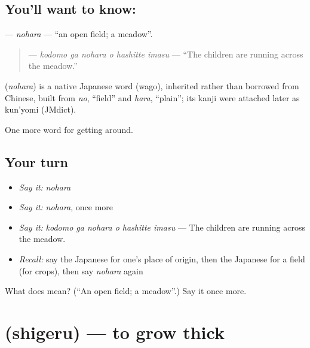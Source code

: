 \subsection*{You'll want to know: }
\textbf{} — \emph{nohara} — \textquotedblleft{}an open field; a meadow\textquotedblright{}.

\begin{quote}
\textbf{  } — \emph{kodomo ga nohara o hashitte imasu} — \textquotedblleft{}The children are running across the meadow.\textquotedblright{}
\end{quote}

\begin{cousinweb}
\textbf{} (\emph{nohara}) is a native Japanese word (wago), inherited rather than borrowed from Chinese, built from \emph{no}, \textquotedblleft{}field\textquotedblright{} and \emph{hara}, \textquotedblleft{}plain\textquotedblright{}; its kanji were attached later as kun'yomi (JMdict).
\end{cousinweb}

\begin{grammarlens}[title={What you've built}]
One more word for getting around.
\end{grammarlens}

\subsection*{Your turn}
\begin{itemize}
\raggedright
  \item \emph{Say it:} \emph{nohara}
  \item \emph{Say it:} \emph{nohara}, once more
  \item \emph{Say it:} \emph{kodomo ga nohara o hashitte imasu} — The children are running across the meadow.
  \item \emph{Recall:} say the Japanese for one's place of origin, then the Japanese for a field (for crops), then say \emph{nohara} again
\end{itemize}

\begin{tcolorbox}[breakable,colback=teal!4,colframe=teal!35!black,title={Before you move on}]
What does  mean? (\textquotedblleft{}An open field; a meadow\textquotedblright{}.) Say it once more.
\end{tcolorbox}
\section[\texorpdfstring{\ja{しげる} (shigeru)}{しげる (shigeru)}]{ (shigeru) — to grow thick}

